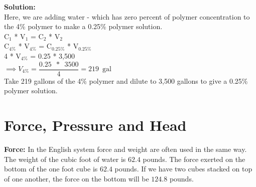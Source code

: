 \textbf{Solution:}\\
\vspace{0.3cm}
Here, we are adding water - which has zero percent of polymer concentration to the 4\% polymer to make a 0.25\% polymer solution.\\
\vspace{0.3cm}
C$_1$ * V$_1$ = C$_2$ * V$_2$\\
\vspace{0.3cm}
C$_{4\%}$ * V$_{4\%}$ =  C$_{0.25\%}$ * V$_{0.25\%}$\\
\vspace{0.3cm}
4 * V$_{4\%}$ =  0.25 * 3,500\\
\vspace{0.3cm}
$\implies V_{4\%} = \dfrac{0.25 \enspace * \enspace 3500}{4}= \boxed{219 \enspace\textrm{gal}} $\\
\vspace{0.3cm}
Take 219 gallons of the 4\% polymer and dilute to 3,500 gallons to give a 0.25\% polymer solution.\\

%

\section{Force, Pressure and Head} 

\textbf{Force:}  In the English system force and weight are often used in the same way. The weight of the cubic foot of water is $62.4$ pounds. The force exerted on the bottom of the one foot cube is $62.4$ pounds. If we have two cubes stacked on top of one another, the force on the bottom will be $124.8$ pounds.

